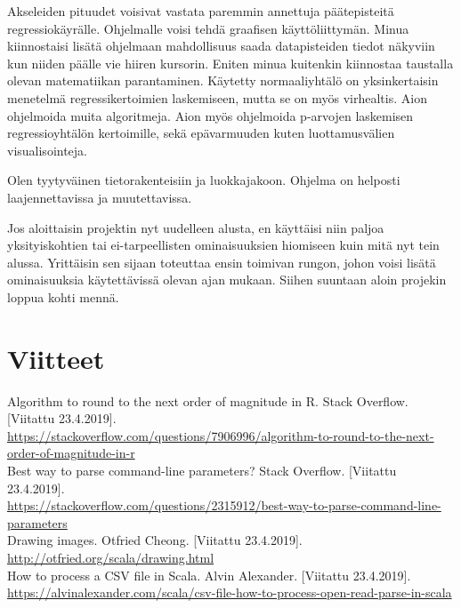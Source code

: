 \documentclass{article}
\begin{document}
        Akseleiden pituudet voisivat vastata paremmin annettuja päätepisteitä regressiokäyrälle.
        Ohjelmalle voisi tehdä graafisen käyttöliittymän. Minua kiinnostaisi lisätä ohjelmaan
        mahdollisuus saada datapisteiden tiedot näkyviin kun niiden päälle vie hiiren kursorin.
        Eniten minua kuitenkin kiinnostaa taustalla olevan matematiikan parantaminen. Käytetty
        normaaliyhtälö on yksinkertaisin menetelmä regressikertoimien laskemiseen, mutta se on
        myös virhealtis. Aion ohjelmoida muita algoritmeja. Aion myös ohjelmoida p-arvojen
        laskemisen regressioyhtälön kertoimille, sekä epävarmuuden kuten luottamusvälien
        visualisointeja.

        Olen tyytyväinen tietorakenteisiin ja luokkajakoon. Ohjelma on helposti laajennettavissa
        ja muutettavissa.

        Jos aloittaisin projektin nyt uudelleen alusta, en käyttäisi niin paljoa yksityiskohtien
        tai ei-tarpeellisten ominaisuuksien hiomiseen kuin mitä nyt tein alussa. Yrittäisin
        sen sijaan toteuttaa ensin toimivan rungon, johon voisi lisätä ominaisuuksia käytettävissä
        olevan ajan mukaan. Siihen suuntaan aloin projekin loppua kohti mennä. 

\section{Viitteet}    

        Algorithm to round to the next order of magnitude in R. Stack Overflow.
        [Viitattu 23.4.2019]. \\
        \url{https://stackoverflow.com/questions/7906996/algorithm-to-round-to-the-next-order-of-magnitude-in-r} \\

        Best way to parse command-line parameters? Stack Overflow. [Viitattu 23.4.2019]. \\ 
        \url{https://stackoverflow.com/questions/2315912/best-way-to-parse-command-line-parameters} \\

        Drawing images. Otfried Cheong. [Viitattu 23.4.2019]. \\
        \url{http://otfried.org/scala/drawing.html} \\        
        
        How to process a CSV file in Scala. Alvin Alexander. [Viitattu 23.4.2019]. \\
        \url{https://alvinalexander.com/scala/csv-file-how-to-process-open-read-parse-in-scala} \\
\end{document}
